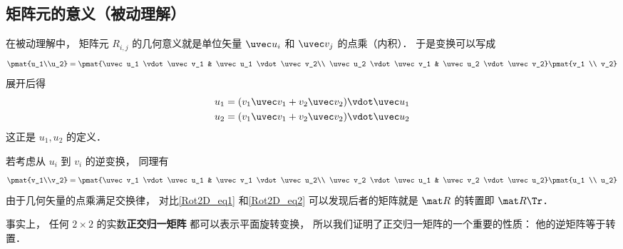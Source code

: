 \subsection{矩阵元的意义（被动理解）}
在被动理解中， 矩阵元 $R_{i,j}$ 的几何意义就是单位矢量 $\uvec u_i$ 和 $\uvec v_j$ 的点乘（内积）． 于是变换可以写成
\begin{equation}\label{Rot2D_eq1}
\pmat{u_1\\u_2} = \pmat{\uvec u_1 \vdot \uvec v_1 & \uvec u_1 \vdot \uvec v_2\\ \uvec u_2 \vdot \uvec v_1 & \uvec u_2 \vdot \uvec v_2} \pmat{v_1 \\ v_2}
\end{equation}
展开后得
\begin{equation}
\begin{aligned}
&u_1 = (v_1 \uvec v_1 + v_2 \uvec v_2) \vdot \uvec u_1\\
&u_2 = (v_1 \uvec v_1 + v_2 \uvec v_2) \vdot \uvec u_2
\end{aligned}
\end{equation}
这正是 $u_1, u_2$ 的定义．

若考虑从 $u_i$ 到 $v_i$ 的逆变换， 同理有
\begin{equation}\label{Rot2D_eq2}
\pmat{v_1\\v_2} = \pmat{\uvec v_1 \vdot \uvec u_1 & \uvec v_1 \vdot \uvec u_2\\ \uvec v_2 \vdot \uvec u_1 & \uvec v_2 \vdot \uvec u_2} \pmat{u_1 \\ u_2}
\end{equation}
由于几何矢量的点乘满足交换律， 对比\autoref{Rot2D_eq1} 和\autoref{Rot2D_eq2} 可以发现后者的矩阵就是 $\mat R$ 的转置即 $\mat R\Tr$．

事实上， 任何 $2\times2$ 的实数\textbf{正交归一矩阵} 都可以表示平面旋转变换， 所以我们证明了正交归一矩阵的一个重要的性质： 他的逆矩阵等于转置．
